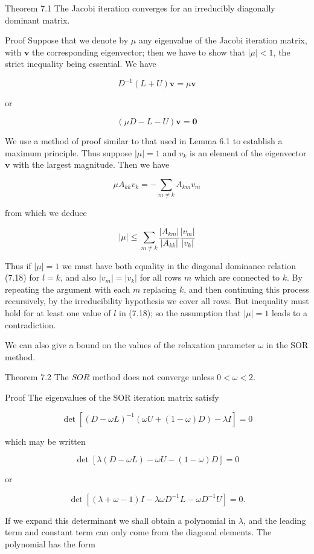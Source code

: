 \documentclass[10pt]{article}
\begin{document}
Theorem 7.1 The Jacobi iteration converges for an irreducibly diagonally dominant matrix.

Proof Suppose that we denote by \(\mu\) any eigenvalue of the Jacobi iteration matrix, with \(\mathbf{v}\) the corresponding eigenvector; then we have to show that \(|\mu|<1\), the strict inequality being essential. We have

\[
D^{-1}(L+U) \mathbf{v}=\mu \mathbf{v}
\]

or

\[
(\mu D-L-U) \mathbf{v}=\mathbf{0}
\]

We use a method of proof similar to that used in Lemma 6.1 to establish a maximum principle. Thus suppose \(|\mu|=1\) and \(v_{k}\) is an element of the eigenvector \(\mathbf{v}\) with the largest magnitude. Then we have

\[
\mu A_{k k} v_{k}=-\sum_{m \neq k} A_{k m} v_{m}
\]

from which we deduce

\[
|\mu| \leq \sum_{m \neq k} \frac{\left|A_{k m}\right|}{\left|A_{k k}\right|} \frac{\left|v_{m}\right|}{\left|v_{k}\right|}
\]

Thus if \(|\mu|=1\) we must have both equality in the diagonal dominance relation (7.18) for \(l=k\), and also \(\left|v_{m}\right|=\left|v_{k}\right|\) for all rows \(m\) which are connected to \(k\). By repeating the argument with each \(m\) replacing \(k\), and then continuing this process recursively, by the irreducibility hypothesis we cover all rows. But inequality must hold for at least one value of \(l\) in (7.18); so the assumption that \(|\mu|=1\) leads to a contradiction.

We can also give a bound on the values of the relaxation parameter \(\omega\) in the SOR method.

Theorem 7.2 The \(S O R\) method does not converge unless \(0<\omega<2\).

Proof The eigenvalues of the SOR iteration matrix satisfy

\[
\operatorname{det}\left[(D-\omega L)^{-1}(\omega U+(1-\omega) D)-\lambda I\right]=0
\]

which may be written

\[
\operatorname{det}[\lambda(D-\omega L)-\omega U-(1-\omega) D]=0
\]

or

\[
\operatorname{det}\left[(\lambda+\omega-1) I-\lambda \omega D^{-1} L-\omega D^{-1} U\right]=0 .
\]

If we expand this determinant we shall obtain a polynomial in \(\lambda\), and the leading term and constant term can only come from the diagonal elements. The polynomial has the form
\end{document}
